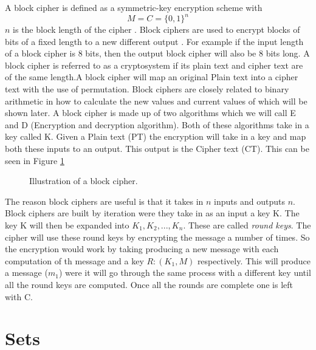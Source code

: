 \documentclass[11pt,a4paper]{report}
\begin{document}
A block cipher is defined as a symmetric-key encryption scheme with
\begin{displaymath}
 M = C = \{0,1\}^{n}
\end{displaymath}
 $n$ is the block length of the cipher \cite{DBLP:series/isc/DelfsK07}. Block ciphers are used to encrypt blocks of bits of a fixed length to a new different output \cite{DBLP:books/sp/Buchmann02}. For example if the input length of a block cipher is 8 bits, then the output block cipher will also be 8 bits long. A block cipher is referred to as a cryptosystem if its plain text and cipher text are of the same length.A block cipher will map an original Plain text into a cipher text with the use of permutation. Block ciphers are closely related to binary arithmetic in how to calculate the new values and current values of which will be shown later.
A block cipher is made up of two algorithms which we will call E and D (Encryption and decryption algorithm). Both of these algorithms take in a key called K. Given a Plain text (PT) the encryption will take in a key and map both these inputs to an output. This output is the Cipher text (CT). This can be seen in Figure \ref*{fig:2.2.1}


\begin{figure}[H]
\centering
\caption{Illustration of a block cipher.}
\label{fig:2.2.1}
\end{figure}



The reason block ciphers are useful is that it takes in $n$ inputs and outputs $n$. Block ciphers are built by iteration were they take in as an input a key K. The key K will then be expanded into $K_{1}, K_{2},..., K_{n}$. These are called \emph{round keys}. The cipher will use these round keys by encrypting the message a number of times. So the encryption would work by taking producing a new message with each computation of th message and a key $R: (K_{1}, M)$ respectively. This will produce a message ($m_{1}$) were it will go through the same process with a different key until all the round keys are computed. Once all the rounds are complete one is left with C.

\section{Sets}
\label{sec:sets}
\end{document}
